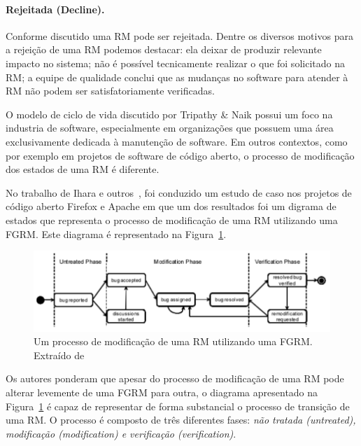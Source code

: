 \paragraph{Rejeitada (Decline).}
\label{par:rejeitada}

Conforme discutido uma RM pode ser rejeitada. Dentre os diversos motivos para a
rejeição de uma RM podemos destacar: ela deixar de produzir relevante impacto no
sistema; não é possível tecnicamente realizar o que foi solicitado na RM\@; a
equipe de qualidade conclui que as mudanças no software para atender à RM não
podem ser satisfatoriamente verificadas.
\todoend{}


O modelo de ciclo de vida discutido por Tripathy \& Naik possui um foco na
industria de software, especialmente em organizações que possuem uma área
exclusivamente dedicada à manutenção de software. Em outros contextos, como por
exemplo em projetos de software de código aberto, o processo de modificação dos
estados de uma RM é diferente.

No trabalho de Ihara e outros~\cite{ihara2009analysis}, foi conduzido um estudo
de caso nos projetos de código aberto Firefox e Apache em que um dos resultados
foi um digrama de estados que representa o processo de modificação de uma RM
utilizando uma FGRM\@. Este diagrama é representado na
Figura~\ref{fig:diagrama-estado-rm-codigo-aberto}.

\begin{figure}[htpb]
	\centering
	\includegraphics[width=0.8\linewidth]{./chapter-manutencao-software-visao-geral/img/diagrama-estado-rm-codigo-aberto.pdf}
	\caption{Um processo de modificação de uma RM utilizando uma FGRM\@. Extraído
	de~\cite{ihara2009analysis}}
\label{fig:diagrama-estado-rm-codigo-aberto}
\end{figure}

Os autores ponderam que apesar do processo de modificação de uma RM pode alterar
levemente de uma FGRM para outra, o diagrama apresentado na
Figura~\ref{fig:diagrama-estado-rm-codigo-aberto} é capaz de representar de
forma substancial o processo de transição de uma RM\@. O processo é composto de
três diferentes fases: \textit{não tratada (untreated), modificação
	(modification) e verificação (verification)}.

